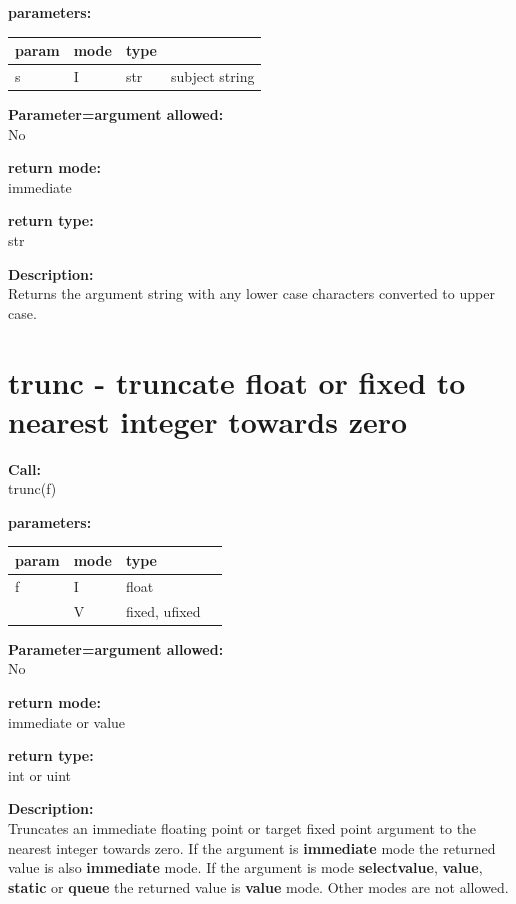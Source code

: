         {\bf parameters:} \\
        \begin{tabular}{| l | l | l | l |}
        \hline
        param  & mode & type & \\
        \hline \hline
        s & I & str & subject string   \\ \hline
        \end{tabular}
        
        {\bf Parameter=argument allowed:} \\
        No
        
        {\bf return mode:} \\
        immediate

        {\bf return type:} \\
        str
        
        {\bf Description:} \\
        Returns the argument string with any lower case characters converted
        to upper case.


    \section{trunc - truncate float or fixed to nearest integer towards zero}\label{sec:iftrunc}
        
        
        {\bf Call:} \\
        trunc(f)
        
        {\bf parameters:} \\
        \begin{tabular}{| l | l | l | l |}
        \hline
        param  & mode & type & \\
        \hline \hline
        f & I & float & \\ \hline
          & V & fixed, ufixed & \\ \hline
        \end{tabular}
        
        {\bf Parameter=argument allowed:} \\
        No
        
        {\bf return mode:} \\
        immediate or value

        {\bf return type:} \\
        int or uint
        
        {\bf Description:} \\
        Truncates an immediate floating point or target fixed point argument to the
        nearest integer towards zero. If the argument is {\bf immediate} mode
        the returned value is also {\bf immediate} mode. If the argument is mode
        {\bf selectvalue}, {\bf value}, {\bf static} or {\bf queue} the returned
        value is {\bf value} mode. Other modes are not allowed.

